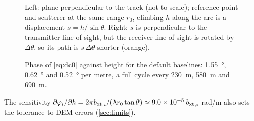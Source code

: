\begin{figure}[htbp]
\centering

\caption[Origin of the topographic residual]{Left: plane perpendicular to the track (not to scale); reference point and
scatterer at the same range $r_0$, climbing $h$ along the arc is a displacement $s=h/\sin\theta$. Right: $s$ is perpendicular
to the transmitter line of sight, but the receiver line of sight is rotated by $\Delta\theta$, so its path is $s\,\Delta\theta$
shorter (orange).}
\label{fig:crosstrack}
\end{figure}

\begin{figure}[htbp]
\centering
{}
\caption[Phase of the topographic residual]{Phase of \eqref{eq:dc0} against height for the default baselines:
\SI{1.55}{\degree}, \SI{0.62}{\degree} and \SI{0.52}{\degree} per metre, a full cycle every \SI{230}{m},
\SI{580}{m} and \SI{690}{m}.}
\label{fig:dc0}
\end{figure}

The sensitivity $\partial\varphi_i/\partial h = 2\pi{b_{\mathrm{xt}}}_{,i}/(\lambda r_0\tan\theta)\approx\num{9.0e-5}\,{b_{\mathrm{xt}}}_{,i}$
rad/m also sets the tolerance to DEM errors (\cref{sec:limits}).
